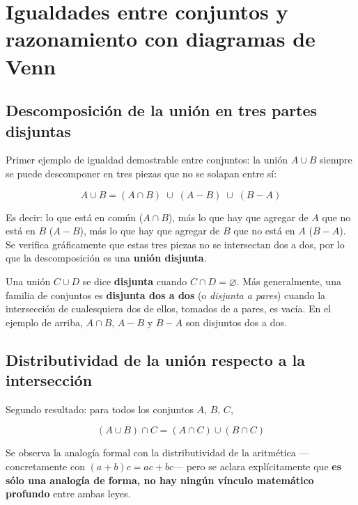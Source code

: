 \documentclass[12pt,a4paper]{article}
\begin{document}
\section{Igualdades entre conjuntos y razonamiento con diagramas de Venn}

\subsection{Descomposición de la unión en tres partes disjuntas}

Primer ejemplo de igualdad demostrable entre conjuntos: la unión $A \cup B$ siempre se puede descomponer en tres piezas que no se solapan entre sí:

\begin{keybox}
$$\boxed{A \cup B = (A \cap B) \;\cup\; (A - B) \;\cup\; (B - A)}$$
\end{keybox}

Es decir: lo que está en común ($A \cap B$), más lo que hay que agregar de $A$ que no está en $B$ ($A-B$), más lo que hay que agregar de $B$ que no está en $A$ ($B-A$). Se verifica gráficamente que estas tres piezas no se intersectan dos a dos, por lo que la descomposición es una \textbf{unión disjunta}.

\begin{notebox}
Una unión $C \cup D$ se dice \textbf{disjunta} cuando $C \cap D = \varnothing$. Más generalmente, una familia de conjuntos es \textbf{disjunta dos a dos} (o \emph{disjunta a pares}) cuando la intersección de cualesquiera dos de ellos, tomados de a pares, es vacía. En el ejemplo de arriba, $A\cap B$, $A-B$ y $B-A$ son disjuntos dos a dos.
\end{notebox}

\subsection{Distributividad de la unión respecto a la intersección}

Segundo resultado: para todos los conjuntos $A$, $B$, $C$,

\begin{keybox}[Distributividad]
$$\boxed{(A \cup B) \cap C = (A \cap C) \cup (B \cap C)}$$
\end{keybox}

Se observa la analogía formal con la distributividad de la aritmética —concretamente con $(a+b)c = ac+bc$— pero se aclara explícitamente que \textbf{es sólo una analogía de forma, no hay ningún vínculo matemático profundo} entre ambas leyes.
\end{document}
